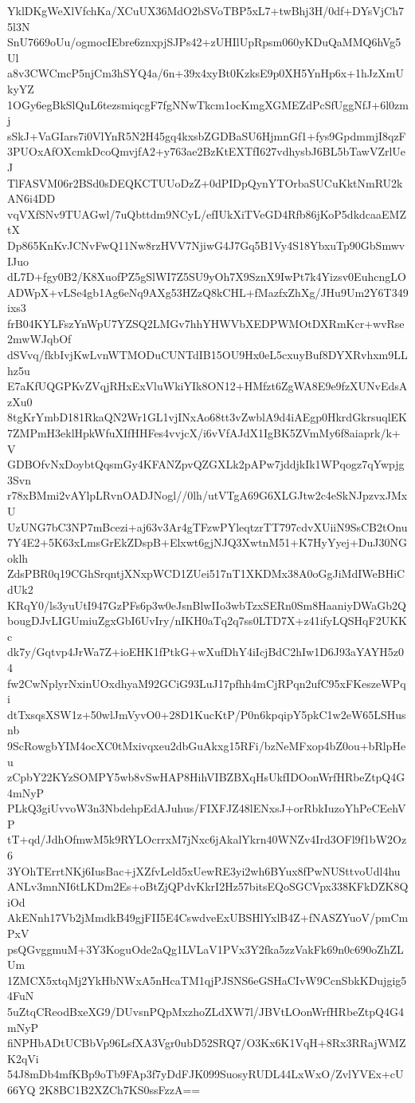 YklDKgWeXlVfchKa/XCuUX36MdO2bSVoTBP5xL7+twBhj3H/0df+DYsVjCh75l3N
SnU7669oUu/ogmocIEbre6znxpjSJPs42+zUHIlUpRpsm060yKDuQaMMQ6hVg5Ul
a8v3CWCmcP5njCm3hSYQ4a/6n+39x4xyBt0KzksE9p0XH5YnHp6x+1hJzXmUkyYZ
1OGy6egBkSlQuL6tezsmiqcgF7fgNNwTkcm1ocKmgXGMEZdPcSfUggNfJ+6l0zmj
sSkJ+VaGIars7i0VlYnR5N2H45gq4kxsbZGDBaSU6HjmnGf1+fys9GpdmmjI8qzF
3PUOxAfOXcmkDcoQmvjfA2+y763ae2BzKtEXTfI627vdhysbJ6BL5bTawVZrlUeJ
TlFASVM06r2BSd0sDEQKCTUUoDzZ+0dPIDpQynYTOrbaSUCuKktNmRU2kAN6i4DD
vqVXfSNv9TUAGwl/7uQbttdm9NCyL/efIUkXiTVeGD4Rfb86jKoP5dkdcaaEMZtX
Dp865KnKvJCNvFwQ11Nw8rzHVV7NjiwG4J7Gq5B1Vy4S18YbxuTp90GbSmwvIJuo
dL7D+fgy0B2/K8XuofPZ5gSlWI7Z5SU9yOh7X9SznX9IwPt7k4Yizsv0EuhcngLO
ADWpX+vLSe4gb1Ag6eNq9AXg53HZzQ8kCHL+fMazfxZhXg/JHu9Um2Y6T349ixs3
frB04KYLFszYnWpU7YZSQ2LMGv7hhYHWVbXEDPWMOtDXRmKcr+wvRse2mwWJqbOf
dSVvq/fkbIvjKwLvnWTMODuCUNTdIB15OU9Hx0eL5cxuyBuf8DYXRvhxm9LLhz5u
E7aKfUQGPKvZVqjRHxExVluWkiYIk8ON12+HMfzt6ZgWA8E9e9fzXUNvEdsAzXu0
8tgKrYmbD181RkaQN2Wr1GL1vjINxAo68tt3vZwblA9d4iAEgp0HkrdGkrsuqlEK
7ZMPmH3eklHpkWfuXIfHHFes4vvjcX/i6vVfAJdX1IgBK5ZVmMy6f8aiaprk/k+V
GDBOfvNxDoybtQqsmGy4KFANZpvQZGXLk2pAPw7jddjkIk1WPqogz7qYwpjg3Svn
r78xBMmi2vAYlpLRvnOADJNogl//0lh/utVTgA69G6XLGJtw2c4eSkNJpzvxJMxU
UzUNG7bC3NP7mBcezi+aj63v3Ar4gTFzwPYleqtzrTT797cdvXUiiN9SsCB2tOnu
7Y4E2+5K63xLmsGrEkZDspB+Elxwt6gjNJQ3XwtnM51+K7HyYyej+DuJ30NGoklh
ZdsPBR0q19CGhSrqntjXNxpWCD1ZUei517nT1XKDMx38A0oGgJiMdIWeBHiCdUk2
KRqY0/ls3yuUtI947GzPFs6p3w0eJsnBlwIIo3wbTzxSERn0Sm8HaaniyDWaGb2Q
bougDJvLIGUmiuZgxGbI6UvIry/nIKH0aTq2q7ss0LTD7X+z41ifyLQSHqF2UKKc
dk7y/Gqtvp4JrWa7Z+ioEHK1fPtkG+wXufDhY4iIcjBdC2hIw1D6J93aYAYH5z04
fw2CwNplyrNxinUOxdhyaM92GCiG93LuJ17pfhh4mCjRPqn2ufC95xFKeszeWPqi
dtTxsqsXSW1z+50wlJmVyvO0+28D1KucKtP/P0n6kpqipY5pkC1w2eW65LSHusnb
9ScRowgbYIM4ocXC0tMxivqxeu2dbGuAkxg15RFi/bzNeMFxop4bZ0ou+bRlpHeu
zCpbY22KYzSOMPY5wb8vSwHAP8HihVIBZBXqHsUkfIDOonWrfHRbeZtpQ4G4mNyP
PLkQ3giUvvoW3n3NbdehpEdAJuhus/FIXFJZ48lENxsJ+orRbkIuzoYhPeCEehVP
tT+qd/JdhOfmwM5k9RYLOcrrxM7jNxc6jAkalYkrn40WNZv4Ird3OFl9f1bW2Oz6
3YOhTErrtNKj6IusBac+jXZfvLeld5xUewRE3yi2wh6BYux8fPwNUSttvoUdl4hu
ANLv3mnNI6tLKDm2Es+oBtZjQPdvKkrI2Hz57bitsEQoSGCVpx338KFkDZK8QiOd
AkENnh17Vb2jMmdkB49gjFII5E4CswdveExUBSHlYxlB4Z+fNASZYuoV/pmCmPxV
psQGvggmuM+3Y3KoguOde2aQg1LVLaV1PVx3Y2fka5zzVakFk69n0c690oZhZLUm
1ZMCX5xtqMj2YkHbNWxA5nHcaTM1qjPJSNS6eGSHaCIvW9CcnSbkKDujgig54FuN
5uZtqCReodBxeXG9/DUvsnPQpMxzhoZLdXW7l/JBVtLOonWrfHRbeZtpQ4G4mNyP
fiNPHbADtUCBbVp96LsfXA3Vgr0ubD52SRQ7/O3Kx6K1VqH+8Rx3RRajWMZK2qVi
54J8mDb4mfKBp9oTb9FAp3f7yDdFJK099SuosyRUDL44LxWxO/ZvlYVEx+cU66YQ
2K8BC1B2XZCh7KS0ssFzzA==
